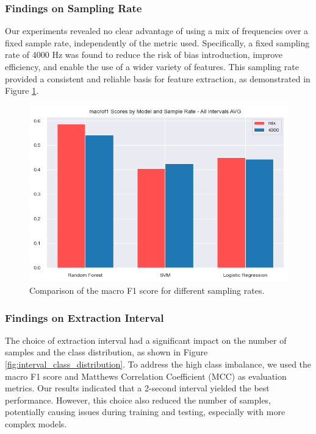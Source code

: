 \documentclass[twocolumn]{class}
\begin{document}
\subsubsection{Findings on Sampling Rate}
Our experiments revealed no clear advantage of using a mix of frequencies over a fixed sample rate, independently of the metric used.
Specifically, a fixed sampling rate of 4000 Hz was found to reduce the risk of bias introduction, improve efficiency, 
and enable the use of a wider variety of features. This sampling rate provided a consistent and reliable basis 
for feature extraction, as demonstrated in Figure \ref{fig:sample_rate_impact}.

\begin{figure}[H]
    \centering
    \includegraphics[width=1\columnwidth]{./images/sample_rate_impact.png}
    \caption{Comparison of the macro F1 score for different sampling rates.}
    \label{fig:sample_rate_impact}
\end{figure}

\subsubsection{Findings on Extraction Interval}
The choice of extraction interval had a significant impact on the number of samples and the class distribution, as shown in Figure \ref{fig:interval_class_distribution}.
To address the high class imbalance, we used the macro F1 score and Matthews Correlation Coefficient (MCC) as evaluation metrics. 
Our results indicated that a 2-second interval yielded the best performance. However, this choice also reduced the number of samples, 
potentially causing issues during training and testing, especially with more complex models. 
\end{document}
